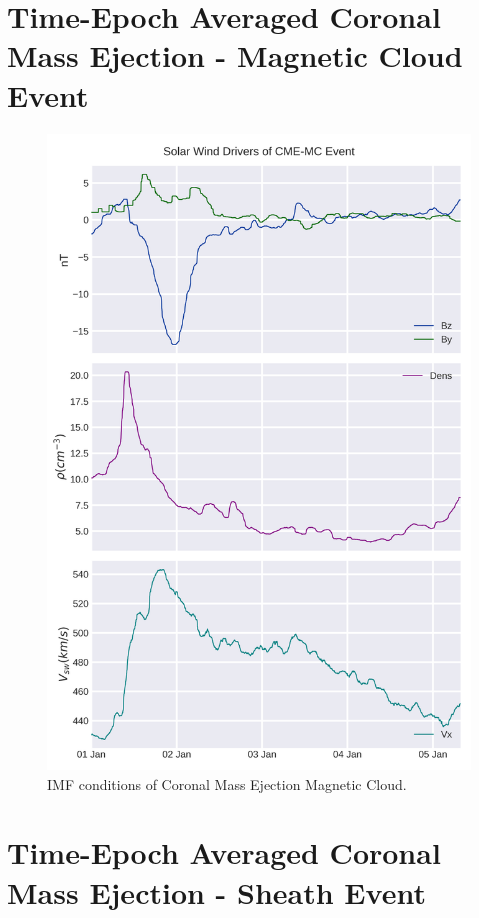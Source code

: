 \documentclass[utf8]{report}
\begin{document}
\section{Time-Epoch Averaged Coronal Mass Ejection - Magnetic Cloud Event}

\begin{figure}[!ht]
\begin{center}
\includegraphics{Ideal Magnetic Cloud.png}
\caption{IMF conditions of Coronal Mass Ejection Magnetic Cloud.}
\label{fig:3}
\end{center}
\end{figure}

\section{Time-Epoch Averaged Coronal Mass Ejection - Sheath Event}
\end{document}
